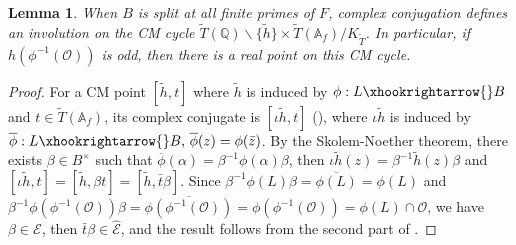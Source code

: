 \documentclass{amsart}
\numberwithin{equation}{subsection}
\numberwithin{theorem}{section}
\newtheorem{lemma}[theorem]{Lemma}
\theoremstyle{definition}
\theoremstyle{remark}
\newcommand{\bA}{\mathbb{A}}
\newcommand{\bQ}{\mathbb{Q}}
\newcommand{\cO}{\mathcal{O}}
\begin{document}
\begin{lemma}\label{lem:realCMpt}
    When $B$ is split at all finite primes of $F$, complex conjugation defines an involution on the CM cycle $\widetilde{T}(\bQ) \backslash \{\tilde{h}\} \times\widetilde{T}(\bA_f) / K_{\widetilde{T}}$. In particular, if $h(\phi^{-1}(\mathcal{O}))$ is odd, then there is a real point on this CM cycle. 
\end{lemma}
\begin{proof}
    For a CM point $[\tilde{h},t]$ where $\tilde{h}$ is induced by $\phi: L\xhookrightarrow{}B$ and $t\in \widetilde{T}(\bA_f)$, its complex conjugate is $[\iota \tilde{h}, t]$ (\cite{MR621017}), where $\iota \tilde{h}$ is induced by $\overline{\phi}: L\xhookrightarrow{}B,\, \overline{\phi}(z) = \phi(\bar{z})$.
    By the Skolem-Noether theorem, there exists $\beta\in B^\times$ such that $\overline{\phi}(\alpha) = \beta^{-1} \phi(\alpha) \beta$, then $\iota \tilde{h}(z) = \beta^{-1} \tilde{h}(z) \beta$ and $[\iota \tilde{h}, t] = [\tilde{h}, \beta t] = [\tilde{h}, \bar{t}\beta]$. 
    Since $\beta^{-1} \phi(L)\beta = \overline{\phi(L)} = \phi(L)$ and $\beta^{-1} \phi(\phi^{-1}(\cO))\beta = \overline{\phi(\phi^{-1}(\cO))} =\phi(\phi^{-1}(\cO))= \phi(L)\cap \cO$, we have $\beta\in \mathcal{E}$, then $\bar{t}\beta \in \widehat{\mathcal{E}}$, and the result follows from the second part of .
\end{proof}
\end{document}
